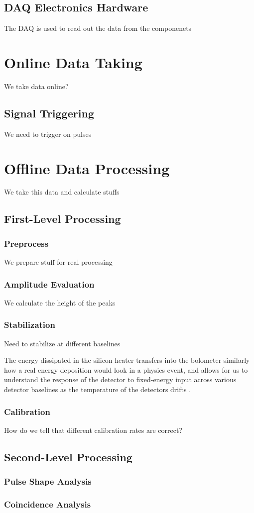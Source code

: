 \subsection{DAQ Electronics Hardware}
The DAQ is used to read out the data from the componenets
\section{Online Data Taking}
We take data online?
\subsection{Signal Triggering}
We need to trigger on pulses
\section{Offline Data Processing}
We take this data and calculate stuffs
\subsection{First-Level Processing}
\subsubsection{Preprocess}
We prepare stuff for real processing
\subsubsection{Amplitude Evaluation}
We calculate the height of the peaks
\subsubsection{Stabilization}
Need to stabilize at different baselines
\label{ssec:Stabilization}

The energy dissipated in the silicon heater transfers into the bolometer similarly how a real energy deposition would look in a physics event, and allows for us to understand the response of the detector to fixed-energy input across various detector baselines as the temperature of the detectors drifts \cite{ALESSANDRELLO1998454:Si-heater}.

\subsubsection{Calibration}
How do we tell that different calibration rates are correct?
\label{ssec:Calibration}
\subsection{Second-Level Processing}
\subsubsection{Pulse Shape Analysis}
\subsubsection{Coincidence Analysis}



